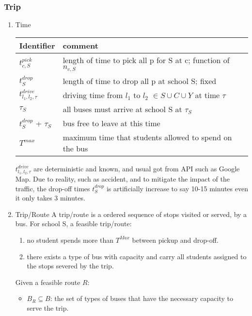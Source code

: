 \documentclass[11pt]{article}
\begin{document}
\subsubsection{Trip}
\label{sec:orgef49fb8}
\begin{enumerate}
\item Time
\label{sec:org90c0f1a}
\begin{center}
\begin{tabular}{ll}
Identifier & comment\\
\hline
\(t_{c,S}^{pick}\) & length of time to pick all p for S at c; function of \(n_{c,S}\)\\
\(t_{S}^{drop}\) & length of time to drop all p at school S; fixed\\
\(t_{l_1,l_2,\tau}^{drive}\) & driving time from \(l_1\) to  \(l_2\) \(\in S \cup C \cup Y\) at time \(\tau\)\\
\(\tau_S\) & all buses must arrive at school S at \(\tau_S\)\\
\(t_{S}^{drop}\) + \(\tau_S\) & bus free to leave at this time\\
\(T^{max}\) & maximum time that students allowed to spend on the bus\\
\end{tabular}
\end{center}

\(t_{l_1,l_2,\tau}^{drive}\) are deterministic and known, and usual got from API
such as Google Map. Due to reality, such as accident, and to mitigate the impact
of the traffic, the drop-off times \(t_{S}^{drop}\) is artificially increase to
say 10-15 minutes even it only takes 3 minutes.

\item Trip/Route
\label{sec:orga494c8f}
A trip/route is a ordered sequence of stops visited or served, by a bus. 
For school S, a feasible trip/route:
\begin{enumerate}
\item no student spends more than \(T^{Max}\) between pickup and drop-off.
\item there exists a type of bus with capacity and carry all students assigned to
the stops severed by the trip.
\end{enumerate}

Given a feasible route \(R\):

\begin{itemize}
\item \(B_R \subseteq B\): the set of types of buses that have the necessary capacity to serve the trip.


\end{itemize}
\end{enumerate}
\end{document}
